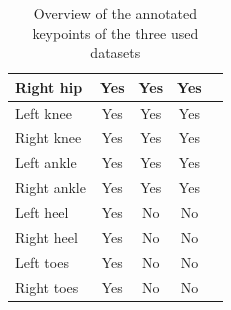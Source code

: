 \documentclass[./main.tex]{subfiles}
\begin{document}
\begin{table}[htbp]
\begin{tabular}{|l|c|c|c|c|}
        Right hip & Yes & Yes & Yes \\ \hline
        Left knee & Yes & Yes & Yes \\ \hline
        Right knee & Yes & Yes & Yes \\ \hline
        Left ankle & Yes & Yes & Yes \\ \hline
        Right ankle & Yes & Yes & Yes \\ \hline
        Left heel & Yes & No & No \\ \hline
        Right heel & Yes & No & No \\ \hline
        Left toes & Yes & No & No \\ \hline
        Right toes & Yes & No & No \\ \hline
    \end{tabular}
    \caption{Overview of the annotated keypoints of the three used datasets}
    \label{tab:keypoints}
\end{table}
\end{document}
